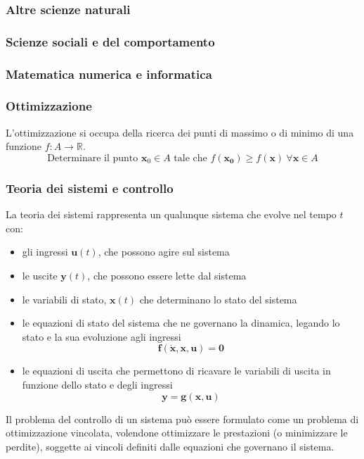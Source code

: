 \subsubsection{Altre scienze naturali}
\subsubsection{Scienze sociali e del comportamento}
\subsubsection{Matematica numerica e informatica}
\subsubsection{Ottimizzazione}
L'ottimizzazione si occupa della ricerca dei punti di massimo o di minimo di una funzione $f:A \rightarrow \mathbb{R}$.
\begin{equation}
    \text{Determinare il punto $\mathbf{x}_0 \in A$ tale che $f(\mathbf{x_0}) \ge f(\mathbf{x}) \ \forall \mathbf{x} \in A$}
\end{equation}
\subsubsection{Teoria dei sistemi e controllo}
La teoria dei sistemi rappresenta un qualunque sistema che evolve nel tempo $t$ con:
\begin{itemize}
    \item gli ingressi $\mathbf{u}(t)$, che possono agire sul sistema
    \item le uscite $\mathbf{y}(t)$, che possono essere lette dal sistema
    \item le variabili di stato, $\mathbf{x}(t)$ che determinano lo stato del sistema
    \item le equazioni di stato del sistema che ne governano la dinamica, legando lo stato e la sua evoluzione agli ingressi
        \begin{equation}
            \mathbf{f}(\dot{\mathbf{x}}, \mathbf{x}, \mathbf{u}) = \mathbf{0}
        \end{equation}
    \item le equazioni di uscita che permettono di ricavare le variabili di uscita in funzione dello stato e degli ingressi
        \begin{equation}
            \mathbf{y} = \mathbf{g}(\mathbf{x}, \mathbf{u})
        \end{equation}
\end{itemize}
Il problema del controllo di un sistema può essere formulato come un problema di ottimizzazione vincolata, volendone ottimizzare le prestazioni (o minimizzare le perdite), soggette ai vincoli definiti dalle equazioni che governano il sistema.
